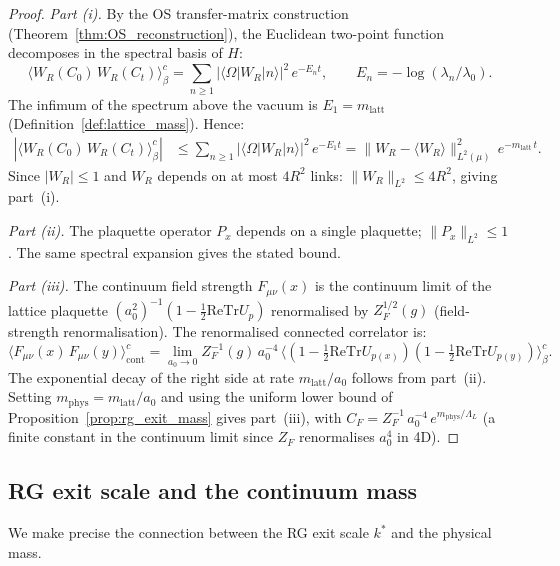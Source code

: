 \documentclass[11pt,a4paper]{amsart}
\theoremstyle{definition}
\newcommand{\re}{\mathrm{Re}}
\newcommand{\Tr}{\mathrm{Tr}}
\begin{document}
\begin{proof}
\emph{Part (i).}
By the OS transfer-matrix construction (Theorem~\ref{thm:OS_reconstruction}),
the Euclidean two-point function decomposes in the spectral basis of $H$:
\[
  \langle W_R(C_0)\,W_R(C_t)\rangle_\beta^c
  = \sum_{n\ge 1} |\langle\Omega|W_R|n\rangle|^2\,e^{-E_n t},
  \qquad E_n = -\log(\lambda_n/\lambda_0).
\]
The infimum of the spectrum above the vacuum is $E_1 = m_{\mathrm{latt}}$
(Definition~\ref{def:lattice_mass}).  Hence:
\begin{align*}
  |\langle W_R(C_0)\,W_R(C_t)\rangle_\beta^c|
  &\le \sum_{n\ge 1} |\langle\Omega|W_R|n\rangle|^2\,e^{-E_1 t}
   = \|W_R - \langle W_R\rangle\|_{L^2(\mu)}^2\,e^{-m_{\mathrm{latt}}\,t}.
\end{align*}
Since $|W_R| \le 1$ and $W_R$ depends on at most $4R^2$ links:
$\|W_R\|_{L^2} \le 4R^2$, giving part~(i).

\emph{Part (ii).}
The plaquette operator $P_x$ depends on a single plaquette; $\|P_x\|_{L^2}\le 1$.
The same spectral expansion gives the stated bound.

\emph{Part (iii).}
The continuum field strength $F_{\mu\nu}(x)$ is the continuum limit of the
lattice plaquette $(a_0^2)^{-1}(1 - \frac{1}{2}\re\Tr U_p)$
renormalised by $Z_F^{1/2}(g)$ (field-strength renormalisation).
The renormalised connected correlator is:
\[
  \langle F_{\mu\nu}(x)\,F_{\mu\nu}(y)\rangle_{\mathrm{cont}}^c
  = \lim_{a_0\to 0} Z_F^{-1}(g)\,a_0^{-4}\,
    \langle (1 - \tfrac{1}{2}\re\Tr U_{p(x)})(1 - \tfrac{1}{2}\re\Tr U_{p(y)})\rangle_{\beta}^c.
\]
The exponential decay of the right side at rate $m_{\mathrm{latt}}/a_0$
follows from part~(ii).  Setting $m_{\mathrm{phys}} = m_{\mathrm{latt}}/a_0$
and using the uniform lower bound of Proposition~\ref{prop:rg_exit_mass}
gives part~(iii), with $C_F = Z_F^{-1}\,a_0^{-4}\,e^{m_{\mathrm{phys}}/\Lambda_L}$
(a finite constant in the continuum limit since $Z_F$ renormalises $a_0^4$ in 4D).
\end{proof}

\subsection{RG exit scale and the continuum mass}
\label{sec:rg_mass}

We make precise the connection between the RG exit scale $k^*$ and the physical mass.
\end{document}
